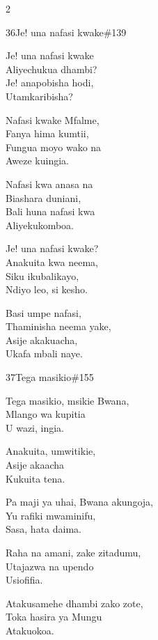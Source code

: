 \begin{multicols}{2}
\begin{hymn}{36}{Je! una nafasi kwake}{\#139}
\begin{stanza}
Je! una nafasi kwake\\
Aliyechukua dhambi?\\
Je! anapobisha hodi,\\
Utamkaribisha?
\end{stanza}
\begin{chorus}
Nafasi kwake Mfalme,\\
Fanya hima kumtii,\\
Fungua moyo wako na\\
Aweze kuingia.
\end{chorus}
\begin{stanza}
Nafasi kwa anasa na\\
Biashara duniani,\\
Bali huna nafasi kwa\\
Aliyekukomboa.
\end{stanza}
\begin{stanza}
Je! una nafasi kwake?\\
Anakuita kwa neema,\\
Siku ikubalikayo,\\
Ndiyo leo, si kesho.
\end{stanza}
\begin{stanza}
Basi umpe nafasi,\\
Thaminisha neema yake,\\
Asije akakuacha,\\
Ukafa mbali naye.
\end{stanza}
\end{hymn}

\begin{hymn}{37}{Tega masikio}{\#155}
\begin{stanza}
Tega masikio, msikie Bwana,\\
Mlango wa kupitia\\
U wazi, ingia.
\end{stanza}
\begin{chorus}
Anakuita, umwitikie,\\
Asije akaacha\\
Kukuita tena.
\end{chorus}
\begin{stanza}
Pa maji ya uhai, Bwana akungoja,\\
Yu rafiki mwaminifu,\\
Sasa, hata daima.
\end{stanza}
\begin{stanza}
Raha na amani, zake zitadumu,\\
Utajazwa na upendo\\
Usiofifia.
\end{stanza}
\begin{stanza}
Atakusamehe dhambi zako zote,\\
Toka hasira ya Mungu\\
Atakuokoa.
\end{stanza}
\end{hymn}


\end{multicols}

